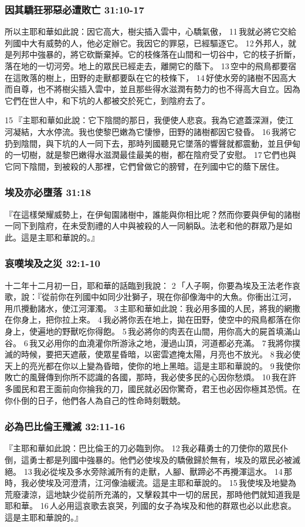 \subsubsection{因其驕狂邪惡必遭敗亡 31:10-17}
所以主耶和華如此說：因它高大，樹尖插入雲中，心驕氣傲， 11 我就必將它交給列國中大有威勢的人，他必定辦它。我因它的罪惡，已經驅逐它。 12 外邦人，就是列邦中強暴的，將它砍斷棄掉。它的枝條落在山間和一切谷中，它的枝子折斷，落在地的一切河旁。地上的眾民已經走去，離開它的蔭下。 13 空中的飛鳥都要宿在這敗落的樹上，田野的走獸都要臥在它的枝條下， 14 好使水旁的諸樹不因高大而自尊，也不將樹尖插入雲中，並且那些得水滋潤有勢力的也不得高大自立。因為它們在世人中，和下坑的人都被交於死亡，到陰府去了。

15 『主耶和華如此說：它下陰間的那日，我便使人悲哀。我為它遮蓋深淵，使江河凝結，大水停流。我也使黎巴嫩為它悽慘，田野的諸樹都因它發昏。 16 我將它扔到陰間，與下坑的人一同下去，那時列國聽見它墜落的響聲就都震動，並且伊甸的一切樹，就是黎巴嫩得水滋潤最佳最美的樹，都在陰府受了安慰。 17 它們也與它同下陰間，到被殺的人那裡，它們曾做它的膀臂，在列國中它的蔭下居住。

\subsubsection{埃及亦必墮落 31:18}
『在這樣榮耀威勢上，在伊甸園諸樹中，誰能與你相比呢？然而你要與伊甸的諸樹一同下到陰府，在未受割禮的人中與被殺的人一同躺臥。法老和他的群眾乃是如此。這是主耶和華說的。』


\subsubsection{哀嘆埃及之災 32:1-10}
十二年十二月初一日，耶和華的話臨到我說： 2 「人子啊，你要為埃及王法老作哀歌，說：『從前你在列國中如同少壯獅子，現在你卻像海中的大魚。你衝出江河，用爪攪動諸水，使江河渾濁。 3 主耶和華如此說：我必用多國的人民，將我的網撒在你身上，把你拉上來。 4 我必將你丟在地上，拋在田野，使空中的飛鳥都落在你身上，使遍地的野獸吃你得飽。 5 我必將你的肉丟在山間，用你高大的屍首填滿山谷。 6 我又必用你的血澆灌你所游泳之地，漫過山頂，河道都必充滿。 7 我將你撲滅的時候，要把天遮蔽，使眾星昏暗，以密雲遮掩太陽，月亮也不放光。 8 我必使天上的亮光都在你以上變為昏暗，使你的地上黑暗。這是主耶和華說的。 9 我使你敗亡的風聲傳到你所不認識的各國，那時，我必使多民的心因你愁煩。 10 我在許多國民和君王面前向你掄我的刀，國民就必因你驚奇，君王也必因你極其恐慌。在你仆倒的日子，他們各人為自己的性命時刻戰兢。

\subsubsection{必為巴比倫王殲滅 32:11-16}
『主耶和華如此說：巴比倫王的刀必臨到你。 12 我必藉勇士的刀使你的眾民仆倒，這勇士都是列國中強暴的。他們必使埃及的驕傲歸於無有，埃及的眾民必被滅絕。 13 我必從埃及多水旁除滅所有的走獸，人腳、獸蹄必不再攪渾這水。 14 那時，我必使埃及河澄清，江河像油緩流。這是主耶和華說的。 15 我使埃及地變為荒廢淒涼，這地缺少從前所充滿的，又擊殺其中一切的居民，那時他們就知道我是耶和華。 16 人必用這哀歌去哀哭，列國的女子為埃及和他的群眾也必以此悲哀。這是主耶和華說的。』


